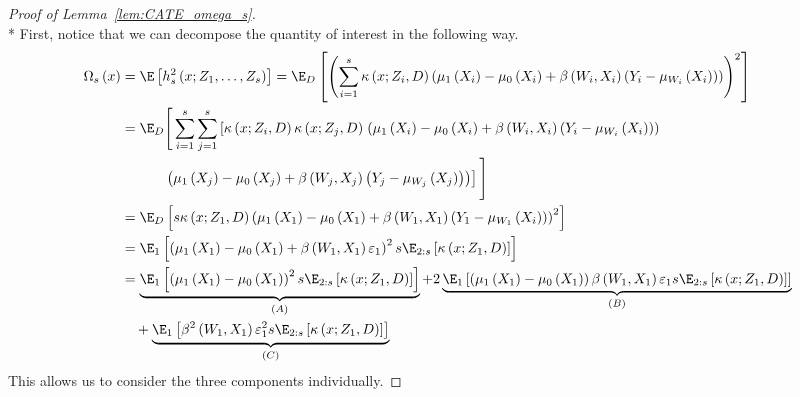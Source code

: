 \begin{proof}[Proof of Lemma~\ref{lem:CATE_omega_s}]\mbox{}\\*
    First, notice that we can decompose the quantity of interest in the following way.
	\begin{equation}
		\begin{aligned}
			\Omega_{s}\left(x\right)
			 & = \E\left[h_{s}^{2}\left(x; Z_1, \ldots,  Z_{s}\right)\right]
             = \E_{D}\left[\left(\sum_{i = 1}^{s} \kappa\left(x; Z_{i}, D\right) \left(\mu_{1}\left(X_{i}\right) - \mu_{0}\left(X_{i}\right) + \beta\left(W_{i}, X_{i}\right)\left(Y_{i} - \mu_{W_{i}}\left(X_{i}\right)\right)\right)\right)^2\right]\\
             & = \E_{D}\Bigg[\sum_{i = 1}^{s}\sum_{j = 1}^{s}\left[\kappa\left(x; Z_{i}, D\right)\kappa\left(x; Z_j, D\right) \right.
             \left(\mu_{1}\left(X_{i}\right) - \mu_{0}\left(X_{i}\right) + \beta\left(W_{i}, X_{i}\right)\left(Y_{i} - \mu_{W_{i}}\left(X_{i}\right)\right)\right)\\
             & \quad \quad \quad \left. \left(\mu_{1}\left(X_j\right) - \mu_{0}\left(X_j\right) + \beta\left(W_j, X_j\right)\left(Y_{j} - \mu_{W_j}\left(X_j\right)\right)\right)
             \right]\Bigg] \\
             & = \E_{D}\left[s \kappa\left(x; Z_1, D\right) \left(\mu_{1}\left(X_1\right) - \mu_{0}\left(X_1\right) + \beta\left(W_{1}, X_1\right)\left(Y_{1} - \mu_{W_{1}}\left(X_{i}\right)\right)\right)^2\right]\\
             & = \E_{1}\left[\left(\mu_{1}\left(X_1\right) - \mu_{0}\left(X_1\right) + \beta\left(W_{1}, X_1\right)\varepsilon_1\right)^2 s \E_{2:s}\left[\kappa\left(x; Z_1, D\right)\right]\right]\\
             & = \underbrace{\E_{1}\left[\left(\mu_{1}\left(X_1\right) - \mu_{0}\left(X_1\right)\right)^2 s \E_{2:s}\left[\kappa\left(x; Z_1, D\right)\right]\right]}_{(A)}
             + 2 \underbrace{\E_{1}\left[\left(\mu_{1}\left(X_1\right) - \mu_{0}\left(X_1\right)\right)\beta\left(W_{1}, X_1\right)\varepsilon_1 s \E_{2:s}\left[\kappa\left(x; Z_1, D\right)\right]\right]}_{(B)}\\
             & \quad + \underbrace{\E_{1}\left[\beta^2\left(W_{1}, X_1\right)\varepsilon_1^2 s \E_{2:s}\left[\kappa\left(x; Z_1, D\right)\right]\right]}_{(C)}
		\end{aligned}
	\end{equation}
    This allows us to consider the three components individually.

\end{proof}

